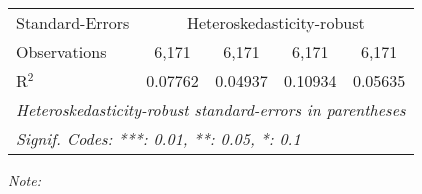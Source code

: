 \begin{table}[htbp!]
\begin{adjustbox}{width = 1\textwidth, max height = 0.95\textheight, center}
\begin{threeparttable}[b]
\begin{tabular}{lcccc}
            \midrule 
            Standard-Errors & \multicolumn{4}{c}{Heteroskedasticity-robust} \\ 
            Observations         & 6,171                           & 6,171                          & 6,171                          & 6,171\\  
            R$^2$                & 0.07762                         & 0.04937                        & 0.10934                        & 0.05635\\  
            \midrule \midrule
            \multicolumn{5}{l}{\emph{Heteroskedasticity-robust standard-errors in parentheses}}\\
            \multicolumn{5}{l}{\emph{Signif. Codes: ***: 0.01, **: 0.05, *: 0.1}}\\
         \end{tabular}
         
         \begin{tablenotes}\item \medskip \textit{Note:}
         \end{tablenotes}
      \end{threeparttable}
   \end{adjustbox}
\end{table}


